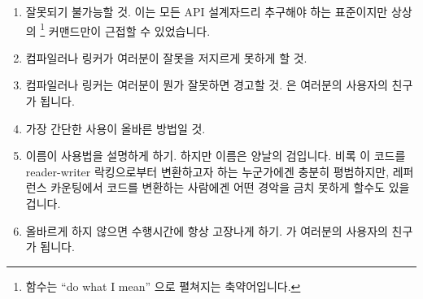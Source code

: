\begin{enumerate}
\item	잘못되기 불가능할 것.
	이는 모든 API 설계자드리 추구해야 하는 표준이지만 상상의
		\footnote{
		 함수는 ``do what I mean'' 으로 펼쳐지는
		축약어입니다.}
	커맨드만이 근접할 수 있었습니다.
\item	컴파일러나 링커가 여러분이 잘못을 저지르게 못하게 할 것.
\item	컴파일러나 링커는 여러분이 뭔가 잘못하면 경고할 것.
	 은 여러분의 사용자의 친구가 됩니다.
\item	가장 간단한 사용이 올바른 방법일 것.
\item	이름이 사용법을 설명하게 하기.
	하지만 이름은 양날의 검입니다.
	비록  이 코드를 reader-writer 락킹으로부터
	변환하고자 하는 누군가에겐 충분히 평범하지만, 레퍼런스 카운팅에서
	코드를 변환하는 사람에겐 어떤 경악을 금치 못하게 할수도 있을 겁니다.
\item	올바르게 하지 않으면 수행시간에 항상 고장나게 하기.
	 가 여러분의 사용자의 친구가 됩니다.

\end{enumerate}
